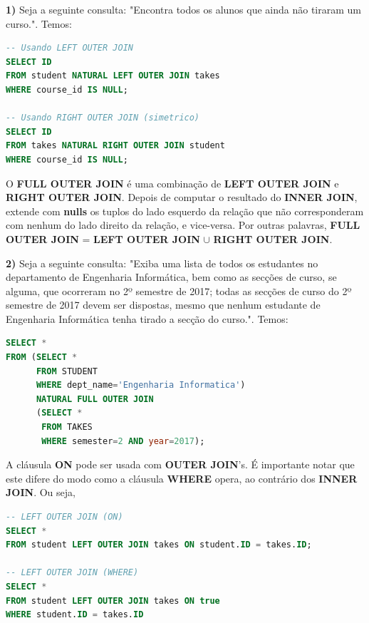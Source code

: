 \documentclass[oneside]{book}
\theoremstyle{definition}
\begin{document}
\textbf{1)} Seja a seguinte consulta: "Encontra todos os alunos que ainda não tiraram um curso.". Temos:
\begin{lstlisting}[language=SQL, morekeywords={REFERENCES, REFRESH, MATERIALIZED, CONCURRENTLY}, framesep=8pt, xleftmargin=40pt, framexleftmargin=40pt, frame=tb, framerule=0pt]
-- Usando LEFT OUTER JOIN
SELECT ID
FROM student NATURAL LEFT OUTER JOIN takes
WHERE course_id IS NULL;

-- Usando RIGHT OUTER JOIN (simetrico)
SELECT ID
FROM takes NATURAL RIGHT OUTER JOIN student
WHERE course_id IS NULL;
\end{lstlisting}

O \textbf{FULL OUTER JOIN} é uma combinação de \textbf{LEFT OUTER JOIN} e \textbf{RIGHT OUTER JOIN}. Depois de computar o resultado do \textbf{INNER JOIN}, extende com \textbf{nulls} os tuplos do lado esquerdo da relação que não corresponderam com nenhum do lado direito da relação, e vice-versa. Por outras palavras, \textbf{FULL OUTER JOIN} = \textbf{LEFT OUTER JOIN} $\cup$ \textbf{RIGHT OUTER JOIN}.

\textbf{2)} Seja a seguinte consulta: "Exiba uma lista de todos os estudantes no departamento de Engenharia Informática, bem como as secções de curso, se alguma, que ocorreram no 2º semestre de 2017; todas as secções de curso do 2º semestre de 2017 devem ser dispostas, mesmo que nenhum estudante de Engenharia Informática tenha tirado a secção do curso.". Temos:
\begin{lstlisting}[language=SQL, morekeywords={REFERENCES, REFRESH, MATERIALIZED, CONCURRENTLY}, framesep=8pt, xleftmargin=40pt, framexleftmargin=40pt, frame=tb, framerule=0pt]
SELECT *
FROM (SELECT *
      FROM STUDENT
      WHERE dept_name='Engenharia Informatica')
      NATURAL FULL OUTER JOIN
      (SELECT * 
       FROM TAKES
       WHERE semester=2 AND year=2017);
\end{lstlisting}

A cláusula \textbf{ON} pode ser usada com \textbf{OUTER JOIN}'s. É importante notar que este difere do modo como a cláusula \textbf{WHERE} opera, ao contrário dos \textbf{INNER JOIN}.
Ou seja,
\begin{lstlisting}[language=SQL, morekeywords={REFERENCES, REFRESH, MATERIALIZED, CONCURRENTLY}, framesep=8pt, xleftmargin=40pt, framexleftmargin=40pt, frame=tb, framerule=0pt]
-- LEFT OUTER JOIN (ON)
SELECT *
FROM student LEFT OUTER JOIN takes ON student.ID = takes.ID;

-- LEFT OUTER JOIN (WHERE)
SELECT *
FROM student LEFT OUTER JOIN takes ON true
WHERE student.ID = takes.ID
\end{lstlisting}
\end{document}
